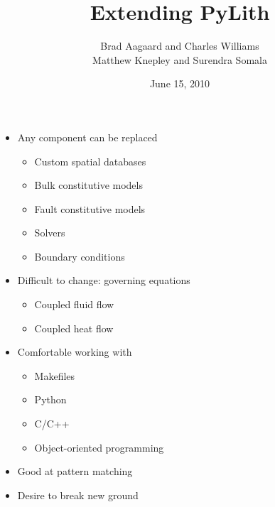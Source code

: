 \documentclass[pdftex,cig,slideColor]{pp4slides}
\title{Extending PyLith}
\author{Brad Aagaard and Charles Williams\\[10pt]
  Matthew Knepley and Surendra Somala}
\date{June 15, 2010}
\begin{document}
\maketitle

  \summary{}

  \begin{itemize}
  \item Any component can be replaced
    \begin{itemize}
    \item Custom spatial databases
    \item Bulk constitutive models
    \item Fault constitutive models
    \item Solvers
    \item Boundary conditions
    \end{itemize}
  \item Difficult to change: governing equations
    \begin{itemize}
    \item Coupled fluid flow
    \item Coupled heat flow
    \end{itemize}
  \end{itemize}  





  \begin{itemize}
  \item Comfortable working with
    \begin{itemize}
    \item Makefiles
    \item Python
    \item C/C++
    \item Object-oriented programming
    \end{itemize}
  \item Good at pattern matching
  \item Desire to break new ground
  \end{itemize}    
\end{document}
